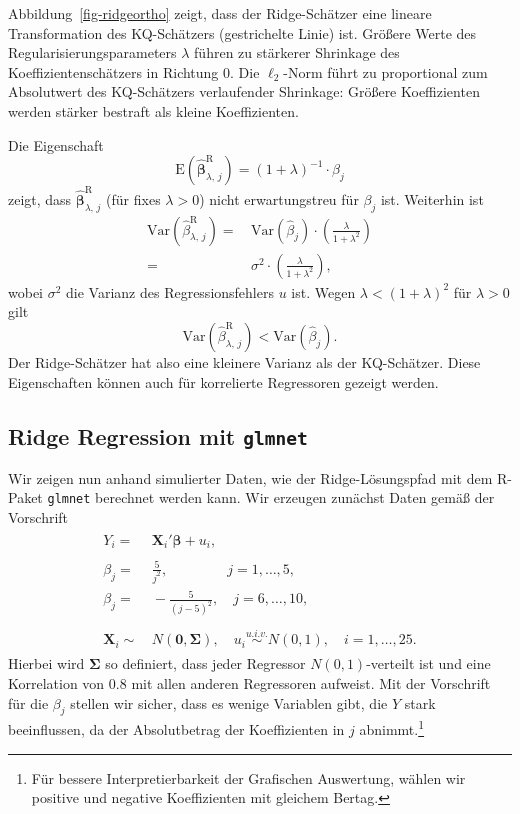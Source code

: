 \documentclass[
  a4paper,
  DIV=11,
  oneside]{scrreprt}
\begin{document}
Abbildung~\ref{fig-ridgeortho} zeigt, dass der Ridge-Schätzer eine
lineare Transformation des KQ-Schätzers (gestrichelte Linie) ist.
Größere Werte des Regularisierungsparameters \(\lambda\) führen zu
stärkerer Shrinkage des Koeffizientenschätzers in Richtung 0. Die
\(\ell_2\)-Norm führt zu proportional zum Absolutwert des KQ-Schätzers
verlaufender Shrinkage: Größere Koeffizienten werden stärker bestraft
als kleine Koeffizienten.

Die Eigenschaft
\[\mathrm{E}\left(\widehat{\boldsymbol{\beta}}^{\mathrm{R}}_{\lambda,\,j}\right) = (1+\lambda)^{-1} \cdot \beta_j\]
zeigt, dass \(\widehat{\boldsymbol{\beta}}^{\mathrm{R}}_{\lambda,\,j}\)
(für fixes \(\lambda>0\)) nicht erwartungstreu für \(\beta_j\) ist.
Weiterhin ist \begin{align*}
  \mathrm{Var}\left(\widehat{\beta}^{\mathrm{R}}_{\lambda,\,j}\right) =&\, 
  \mathrm{Var}\left(\widehat{\beta}_j\right) \cdot \left(\frac{\lambda}{1+\lambda^2}\right)\\
    =&\, \sigma^2\cdot \left(\frac{\lambda}{1+\lambda^2}\right),
\end{align*} wobei \(\sigma^2\) die Varianz des Regressionsfehlers \(u\)
ist. Wegen \(\lambda<(1+\lambda)^2\) für \(\lambda>0\) gilt
\[\mathrm{Var}\left(\widehat{\beta}^{\mathrm{R}}_{\lambda,\,j}\right)<\mathrm{Var}\left(\widehat{\beta}_j\right).\]
Der Ridge-Schätzer hat also eine kleinere Varianz als der KQ-Schätzer.
Diese Eigenschaften können auch für korrelierte Regressoren gezeigt
werden.

\hypertarget{ridge-regression-mit-glmnet}{%
\subsection{\texorpdfstring{Ridge Regression mit
\texttt{glmnet}}{Ridge Regression mit glmnet}}\label{ridge-regression-mit-glmnet}}

Wir zeigen nun anhand simulierter Daten, wie der Ridge-Lösungspfad mit
dem R-Paket \texttt{glmnet} berechnet werden kann. Wir erzeugen zunächst
Daten gemäß der Vorschrift \begin{align}
  \begin{split}
  Y_i =&\, \boldsymbol{X}_i' \boldsymbol{\beta} + u_i,\\
  \\
  \beta_j =&\,  \frac{5}{j^2}, \qquad\qquad\ j=1,\dots,5,\\ 
  \beta_j =&\, -\frac{5}{(j-5)^2}, \quad j=6,\dots,10,\\
  \\
  \boldsymbol{X}_i \sim&\, N(\boldsymbol{0}, \boldsymbol{\Sigma}), \quad u_i \overset{u.i.v.}{\sim} N(0, 1), \quad i = 1,\dots,25.
  \end{split} \label{eq:ridgedgp1}
\end{align} Hierbei wird \(\boldsymbol{\Sigma}\) so definiert, dass
jeder Regressor \(N(0,1)\)-verteilt ist und eine Korrelation von \(0.8\)
mit allen anderen Regressoren aufweist. Mit der Vorschrift für die
\(\beta_j\) stellen wir sicher, dass es wenige Variablen gibt, die \(Y\)
stark beeinflussen, da der Absolutbetrag der Koeffizienten in \(j\)
abnimmt.\footnote{Für bessere Interpretierbarkeit der Grafischen
  Auswertung, wählen wir positive und negative Koeffizienten mit
  gleichem Bertag.}
\end{document}
